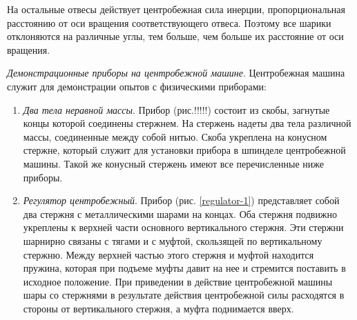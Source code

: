 \documentclass[14pt,a4paper,oneside]{extarticle}	%
\begin{document}
На остальные отвесы действует центробежная сила инерции, пропорциональная расстоянию от оси вращения соответствующего отвеса.
Поэтому все шарики отклоняются на различные углы, тем больше, чем больше их расстояние от оси вращения.

\textit{Демонстрационные приборы на центробежной машине}. 
Центробежная машина служит для демонстрации опытов с физическими приборами:
\begin{enumerate} 
	\item \textit{Два тела неравной массы}. Прибор (рис.!!!!!) состоит из скобы, загнутые концы которой соединены стержнем. На стержень надеты два тела различной массы, соединенные между собой нитью. Скоба укреплена на конусном стержне, который служит для установки прибора в шпинделе центробежной машины. Такой же конусный стержень имеют все перечисленные ниже приборы.
	\item \textit{Регулятор центробежный}. Прибор (рис. \ref{regulator-1}) представляет собой два стержня с металлическими шарами на концах.
	Оба стержня подвижно укреплены к верхней части основного вертикального стержня. Эти стержни шарнирно связаны с тягами и с муфтой, скользящей по вертикальному стержню. Между верхней частью этого стержня и муфтой находится пружина, которая при подъеме муфты давит на нее и стремится поставить в исходное положение.
	При приведении в действие центробежной машины шары со стержнями в результате действия центробежной силы расходятся в стороны от вертикального стержня, а муфта поднимается вверх.
	\end{enumerate}
\end{document}
